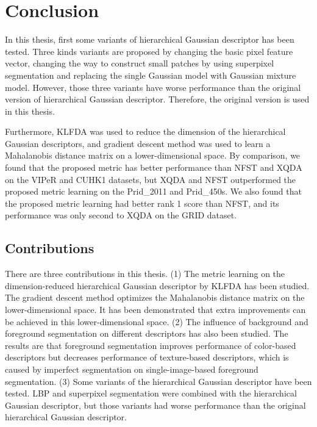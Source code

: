 
\chapter{Conclusion} %

In this thesis, first some variants of hierarchical Gaussian descriptor has been tested. Three kinds variants are proposed by changing the basic pixel feature vector, changing the way to construct small patches by using superpixel segmentation and replacing the single Gaussian model with Gaussian mixture model. However, those three variants have worse performance than the original version of hierarchical Gaussian descriptor. Therefore, the original version is used in this thesis.

Furthermore, KLFDA was used to reduce the dimension of the hierarchical Gaussian descriptors, and gradient descent method was used to learn a Mahalanobis distance matrix on a lower-dimensional space. By comparison, we found that the proposed metric has better performance than NFST and XQDA on the VIPeR and CUHK1 datasets, but XQDA and NFST outperformed the proposed metric learning on the Prid\_2011 and Prid\_450s. We also found that the proposed metric learning had better rank 1 score than NFST, and its performance was only second to XQDA on the GRID dataset. 


\section{Contributions}
There are three contributions in this thesis. (1) The metric learning on the dimension-reduced hierarchical Gaussian descriptor by KLFDA has been studied. The gradient descent method optimizes the Mahalanobis distance matrix on the lower-dimensional space. It has been demonstrated that extra improvements can be achieved in this lower-dimensional space. (2) The influence of background and foreground segmentation on different descriptors has also been studied. The results are that foreground segmentation improves performance of color-based descriptors but decreases performance of texture-based descriptors, which is caused by imperfect segmentation on single-image-based foreground segmentation. (3) Some variants of the hierarchical Gaussian descriptor have been tested. LBP and superpixel segmentation were combined with the hierarchical Gaussian descriptor, but those variants had worse performance than the original hierarchical Gaussian descriptor.

